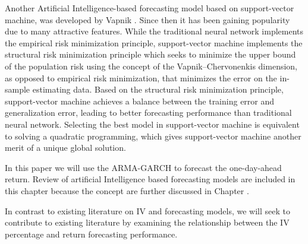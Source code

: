 Another Artificial Intelligence-based forecasting model based on support-vector machine, was developed by Vapnik \cite{Vapnik1}\cite{Vapnik2}. Since then it has been gaining popularity due to many attractive features. While the traditional neural network implements the empirical risk minimization principle, support-vector machine implements the structural risk minimization principle which seeks to minimize the upper bound of the population risk using the concept of the Vapnik–Chervonenkis dimension, as opposed to empirical risk minimization, that minimizes the error on the in-sample estimating data. Based on the structural risk minimization principle, support-vector machine achieves a balance between the training error and generalization error, leading to better forecasting performance than traditional neural network. Selecting the best model in support-vector machine is equivalent to solving a quadratic programming, which gives support-vector machine another merit of a unique global solution. 

In this paper we will use the ARMA-GARCH to forecast the one-day-ahead return. Review of artificial Intelligence based forecasting models are included in this chapter because the concept are further discussed in Chapter \label{FutureWork}.

In contrast to existing literature on IV and forecasting models, we will seek to contribute to existing literature by examining the relationship between the IV percentage and return forecasting performance. 
